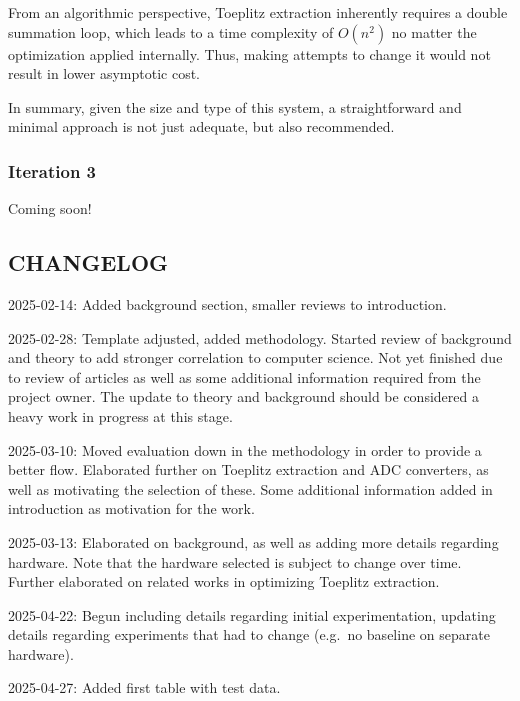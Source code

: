 \documentclass{sigchi}
\begin{document}
From an algorithmic perspective, Toeplitz extraction inherently requires a double summation loop, which leads to a time complexity of \(O(n^2)\) no matter the optimization applied internally. Thus, making attempts to change it would not result in lower asymptotic cost.

In summary, given the size and type of this system, a straightforward and minimal approach is not just adequate, but also recommended.

\subsubsection{Iteration 3}\label{iteration-3}

Coming soon!

\subsection{CHANGELOG}\label{changelog}

2025-02-14: Added background section, smaller reviews to introduction.

2025-02-28: Template adjusted, added methodology. Started review of background and theory to add stronger correlation to computer science. Not yet finished due to review of articles as well as some additional information required from the project owner. The update to theory and background should be considered a heavy work in progress at this stage.

2025-03-10: Moved evaluation down in the methodology in order to provide a better flow. Elaborated further on Toeplitz extraction and ADC converters, as well as motivating the selection of these. Some additional information added in introduction as motivation for the work.

2025-03-13: Elaborated on background, as well as adding more details regarding hardware. Note that the hardware selected is subject to change over time. Further elaborated on related works in optimizing Toeplitz extraction.

2025-04-22: Begun including details regarding initial experimentation, updating details regarding experiments that had to change (e.g.~no baseline on separate hardware).

2025-04-27: Added first table with test data.
\balance{}



\end{document}
